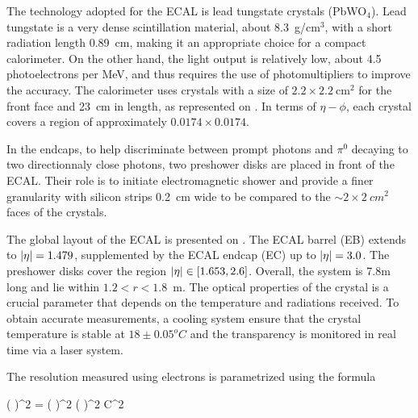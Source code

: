         The technology adopted for the ECAL is lead tungstate crystals (PbWO$_4$). Lead
        tungstate is a very dense scintillation material, about 8.3~g/cm$^3$, with a short
        radiation length 0.89~cm, making it an appropriate choice for a compact calorimeter.
        On the other hand, the light output is relatively low, about 4.5 photoelectrons
        per MeV, and thus requires the use of photomultipliers to improve the accuracy.
        The calorimeter uses crystals with a size of $2.2\times2.2~\text{cm}^2$
        for the front face and 23~cm in length, as represented on .
        In terms of $\eta-\phi$, each crystal covers a region of approximately $0.0174
        \times 0.0174$.


        In the endcaps, to help discriminate between prompt photons and $\pi^0$ decaying
        to two directionnaly close photons, two preshower disks are placed in front of the
        ECAL. Their role is to initiate electromagnetic shower and provide a finer granularity
        with silicon strips 0.2~cm wide to be compared to the $\sim2\times2~cm^2$ faces
        of the crystals.


        The global layout of the ECAL is presented on . The ECAL
        barrel (EB) extends to $\left| \eta \right| = 1.479$, supplemented by the ECAL endcap (EC)
        up to $\left| \eta \right| = 3.0$. The preshower disks cover the region $\left| \eta \right| \in [1.653,2.6]$.
        Overall, the system is 7.8m long and lie within $1.2 < r < 1.8$~m.
        The optical properties of the crystal is a crucial parameter that depends on the
        temperature and radiations received. To obtain accurate measurements, a cooling
        system ensure that the crystal temperature is stable at $18\pm0.05^oC$ and the
        transparency is monitored in real time via a laser system.

        The resolution measured using electrons is parametrized using the formula

        {
            \left(  \right)^2
            =
            \left(  \right)^2
            \oplus
            \left(  \right)^2
            \oplus
            C^2
        }

